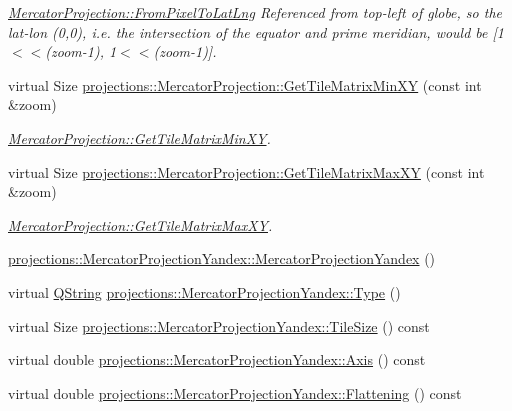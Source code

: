\begin{DoxyCompactItemize}
\begin{DoxyCompactList}\small\item\em \hyperlink{group___o_p_map_widget_gaaa80928cf51f4c3a7e860678a7bf51ee}{\-Mercator\-Projection\-::\-From\-Pixel\-To\-Lat\-Lng} \-Referenced from top-\/left of globe, so the lat-\/lon (0,0), i.\-e. the intersection of the equator and prime meridian, would be \mbox{[}1$<$$<$(zoom-\/1), 1$<$$<$(zoom-\/1)\mbox{]}. \end{DoxyCompactList}\item 
virtual \-Size \hyperlink{group___o_p_map_widget_ga9596b6c85652a05e732147c5e6e299ee}{projections\-::\-Mercator\-Projection\-::\-Get\-Tile\-Matrix\-Min\-X\-Y} (const int \&zoom)
\begin{DoxyCompactList}\small\item\em \hyperlink{group___o_p_map_widget_ga9596b6c85652a05e732147c5e6e299ee}{\-Mercator\-Projection\-::\-Get\-Tile\-Matrix\-Min\-X\-Y}. \end{DoxyCompactList}\item 
virtual \-Size \hyperlink{group___o_p_map_widget_ga4c7d16ae190aea2fd84e2e046b14c39e}{projections\-::\-Mercator\-Projection\-::\-Get\-Tile\-Matrix\-Max\-X\-Y} (const int \&zoom)
\begin{DoxyCompactList}\small\item\em \hyperlink{group___o_p_map_widget_ga4c7d16ae190aea2fd84e2e046b14c39e}{\-Mercator\-Projection\-::\-Get\-Tile\-Matrix\-Max\-X\-Y}. \end{DoxyCompactList}\item 
\hyperlink{group___o_p_map_widget_gaebc460c991ff6702512b15ff65b33ece}{projections\-::\-Mercator\-Projection\-Yandex\-::\-Mercator\-Projection\-Yandex} ()
\item 
virtual \hyperlink{group___u_a_v_objects_plugin_gab9d252f49c333c94a72f97ce3105a32d}{\-Q\-String} \hyperlink{group___o_p_map_widget_gadfc14a9f761555a7472779402c2c0511}{projections\-::\-Mercator\-Projection\-Yandex\-::\-Type} ()
\item 
virtual \-Size \hyperlink{group___o_p_map_widget_ga54a0f175ca8a37d62e27a2a7916ac6f9}{projections\-::\-Mercator\-Projection\-Yandex\-::\-Tile\-Size} () const 
\item 
virtual double \hyperlink{group___o_p_map_widget_ga8bcc6388e661bbc92a1fab57579f7364}{projections\-::\-Mercator\-Projection\-Yandex\-::\-Axis} () const 
\item 
virtual double \hyperlink{group___o_p_map_widget_gafc15feecfe2d4b87734d398f18a6903b}{projections\-::\-Mercator\-Projection\-Yandex\-::\-Flattening} () const 

\end{DoxyCompactItemize}
